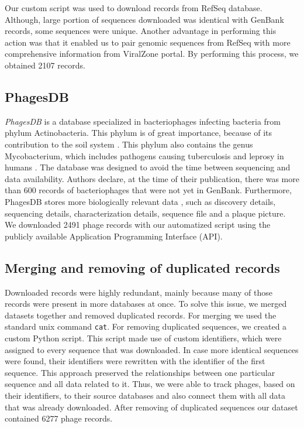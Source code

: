 Our custom script was used to download records from RefSeq database.
Although, large portion of sequences downloaded was identical with GenBank records, some sequences were unique.
Another advantage in performing this action was that it enabled us to pair genomic sequences from RefSeq with more comprehensive information from ViralZone portal.
By performing this process, we obtained 2107 records.


\subsection{PhagesDB}
\emph{PhagesDB} is a database specialized in bacteriophages infecting bacteria from phylum Actinobacteria.
This phylum is of great importance, because of its contribution to the soil system \cite{}.
This phylum also contains the genus Mycobacterium, which includes pathogens causing tuberculosis and leprosy in humans \cite{}.
The database was designed to avoid the time between sequencing and data availability.
Authors declare, at the time of their publication, there was more than 600 records of bacteriophages that were not yet in GenBank.
Furthermore, PhagesDB stores more biologically relevant data , such as discovery details, sequencing details, characterization details, sequence file and a plaque picture.
We downloaded 2491 phage records with our automatized script using the publicly available Application Programming Interface (API).

\subsection{Merging and removing of duplicated records}
Downloaded records were  highly redundant, mainly because many of those records were present in  more databases at once.
To solve this issue, we merged datasets together and removed duplicated records.
For merging we used the standard unix command \verb|cat|.
For removing duplicated sequences, we created a custom Python script.
This script made use of custom identifiers, which were assigned to every sequence that was downloaded.
In case more identical sequences were found, their identifiers were rewritten with the identifier of the first sequence.
This approach preserved the relationships between one particular sequence and all data related to it.
Thus, we were able to track phages, based on their identifiers, to their source databases and also connect them with all data that was already downloaded.
After removing of duplicated sequences our dataset contained 6277 phage records.

